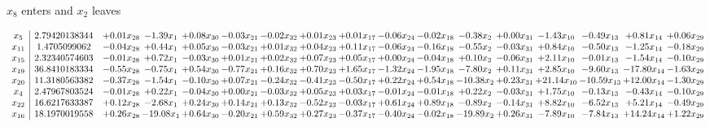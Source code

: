 \documentclass[9pt]{article}
\begin{document}
 $ x_{8} $ enters and $ x_{2} $ leaves 

 \[\begin{array}{c| c c@{\hskip 2pt} c@{\hskip 2pt} c@{\hskip 2pt} c@{\hskip 2pt} c@{\hskip 2pt} c@{\hskip 2pt} c@{\hskip 2pt} c@{\hskip 2pt} c@{\hskip 2pt} c@{\hskip 2pt} c@{\hskip 2pt} c@{\hskip 2pt} c@{\hskip 2pt} c@{\hskip 2pt} c@{\hskip 2pt} }
 x_{5}   &  2.79420138344 & +  0.01 x_{28} & -1.39 x_{1} & +  0.08 x_{30} & -0.03 x_{21} & -0.02 x_{32} & +  0.01 x_{23} & +  0.01 x_{17} & -0.06 x_{24} & -0.02 x_{18} & -0.38 x_{2} & +  0.00 x_{31} & -1.43 x_{10} & -0.49 x_{13} & +  0.81 x_{14} & +  0.06 x_{29}\\
 x_{11}   &  1.4705099062 & -0.04 x_{28} & +  0.44 x_{1} & +  0.05 x_{30} & -0.03 x_{21} & +  0.01 x_{32} & +  0.04 x_{23} & +  0.11 x_{17} & -0.06 x_{24} & -0.16 x_{18} & -0.55 x_{2} & -0.03 x_{31} & +  0.84 x_{10} & -0.50 x_{13} & -1.25 x_{14} & -0.18 x_{29}\\
 x_{15}   &  2.32340574603 & -0.01 x_{28} & +  0.72 x_{1} & -0.03 x_{30} & +  0.01 x_{21} & +  0.02 x_{32} & +  0.07 x_{23} & +  0.05 x_{17} & +  0.00 x_{24} & -0.04 x_{18} & +  0.10 x_{2} & -0.06 x_{31} & +  2.11 x_{10} & -0.01 x_{13} & -1.54 x_{14} & -0.10 x_{29}\\
 x_{19}   &  36.8410183334 & -0.55 x_{28} & -0.75 x_{1} & +  0.54 x_{30} & -0.77 x_{21} & +  0.16 x_{32} & +  0.70 x_{23} & +  1.65 x_{17} & -1.32 x_{24} & -1.95 x_{18} & -7.80 x_{2} & +  0.11 x_{31} & +  2.85 x_{10} & -9.60 x_{13} & -17.80 x_{14} & -1.63 x_{29}\\
 x_{20}   &  11.3180563382 & -0.37 x_{28} & -1.54 x_{1} & -0.10 x_{30} & +  0.07 x_{21} & -0.24 x_{32} & -0.41 x_{23} & -0.50 x_{17} & +  0.22 x_{24} & +  0.54 x_{18} & -10.38 x_{2} & +  0.23 x_{31} & + 21.14 x_{10} & -10.59 x_{13} & + 12.00 x_{14} & -1.30 x_{29}\\
 x_{4}   &  2.47967803524 & -0.01 x_{28} & +  0.22 x_{1} & -0.04 x_{30} & +  0.00 x_{21} & -0.03 x_{32} & +  0.05 x_{23} & +  0.03 x_{17} & -0.01 x_{24} & -0.01 x_{18} & +  0.22 x_{2} & -0.03 x_{31} & +  1.75 x_{10} & -0.13 x_{13} & -0.43 x_{14} & -0.10 x_{29}\\
 x_{22}   &  16.6217633387 & +  0.12 x_{28} & -2.68 x_{1} & +  0.24 x_{30} & +  0.14 x_{21} & +  0.13 x_{32} & -0.52 x_{23} & -0.03 x_{17} & +  0.61 x_{24} & +  0.89 x_{18} & -0.89 x_{2} & -0.14 x_{31} & +  8.82 x_{10} & -6.52 x_{13} & +  5.21 x_{14} & -0.49 x_{29}\\
 x_{16}   &  18.1970019558 & +  0.26 x_{28} & -19.08 x_{1} & +  0.64 x_{30} & -0.20 x_{21} & +  0.59 x_{32} & +  0.27 x_{23} & -0.37 x_{17} & -0.40 x_{24} & -0.02 x_{18} & -19.89 x_{2} & +  0.26 x_{31} & -7.89 x_{10} & -7.84 x_{13} & + 14.24 x_{14} & +  1.22 x_{29}\\

\end{array}\]
\end{document}
